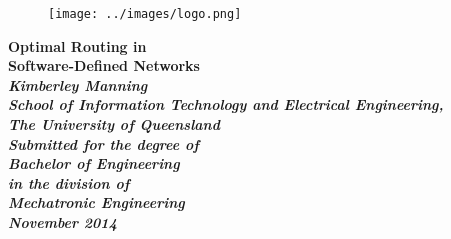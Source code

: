 \begin{titlepage}
\renewcommand{\baselinestretch}{1.0}
\begin{figure}[h]
\centering
\texttt{[image: ../images/logo.png]}
\end{figure}
\begin{center}
\vspace*{35mm}
\Huge\bf
        Optimal Routing in \\
				Software-Defined Networks \\
\vspace{20mm}
\large\sl
        Kimberley Manning
                \bigskip\\
\rm
                School of Information Technology and Electrical Engineering,\\
                The University of Queensland\\
\vspace{30mm}   
                Submitted for the degree of\\
                Bachelor of Engineering
                \smallskip\\
\normalsize
                in the division of\\
                Mechatronic Engineering
                \medskip\\
\large
                November 2014
\end{center}
\end{titlepage}

\pagestyle{fancy}
\fancyfoot{}
\fancyhead{}
\renewcommand{\headrulewidth}{0pt}
\fancyfoot[C] {\footnotesize \thepage}

\cleardoublepage

